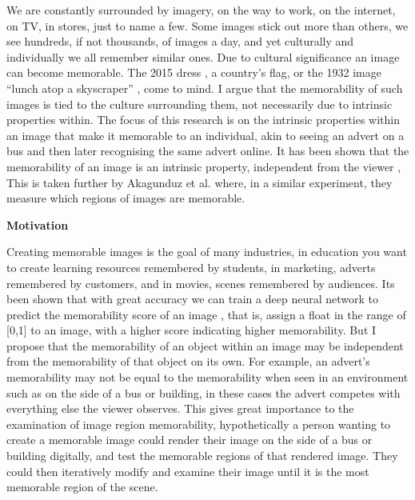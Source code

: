 \documentclass{UoYCSproject}
\begin{document}
We are constantly surrounded by imagery, on the way to work, on the internet, on TV, in stores, just to name a few. Some images stick out more than others, we see hundreds, if not thousands, of images a day, and yet culturally and individually we all remember similar ones. Due to cultural significance an image can become memorable. The 2015 dress \cite{BBCDress2015}, a country's flag, or the 1932 image “lunch atop a skyscraper” \cite{gambino_2012}, come to mind. I argue that the memorability of such images is tied to the culture surrounding them, not necessarily due to intrinsic properties within. The focus of this research is on the intrinsic properties within an image that make it memorable to an individual, akin to seeing an advert on a bus and then later recognising the same advert online.
It has been shown that the memorability of an image is an intrinsic property, independent from the viewer \cite{Isola2011, IsolaParikhTorralbaOliva2011, ICCV15_Khosla, isola2014memorability}, This is taken further by Akagunduz et al. \cite{VischemaPaper} where, in a similar experiment, they measure which regions of images are memorable.

\textbf{Motivation}


Creating memorable images is the goal of many industries, in education you want to create learning resources remembered by students, in marketing, adverts remembered by customers, and in movies, scenes remembered by audiences.  Its been shown that with great accuracy we can train a deep neural network to predict the memorability score of an image \cite{Isola2011, IsolaParikhTorralbaOliva2011, ICCV15_Khosla, isola2014memorability},
that is, assign a float in the range of [0,1] to an image, with a higher score indicating higher memorability. But I propose that the memorability of an object within an image may be independent from the memorability of that object on its own. For example, an advert's memorability may not be equal to the memorability when seen in an environment such as on the side of a bus or building, in these cases the advert competes with everything else the viewer observes. This gives great importance to the examination of image region memorability, hypothetically a person wanting to create a memorable image could render their image on the side of a bus or building digitally, and test the memorable regions of that rendered image. They could then iteratively modify and examine their image until it is the most memorable region of the scene.
\end{document}
